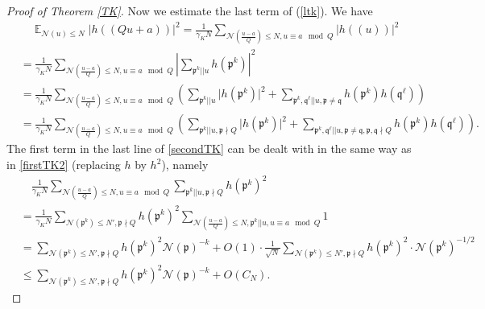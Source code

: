 \documentclass[11pt]{amsart}
\theoremstyle{definition}
\DeclareMathOperator*{\E}{\mathbb{E}}
\newcommand{\NN}{{\mathcal N}}
\newcommand{\mf}{\mathfrak}
\begin{document}
\begin{proof}[Proof of Theorem \ref{TK}]
Now we estimate the last term of (\ref{ltk}). We have
\begin{equation}\label{secondTK}
    \begin{split}
        &\quad \E_{\NN(u) \leq N}\vert h((Qu+a))\vert^{2}
        =\frac{1}{\gamma_{K} N}\sum_{\NN(\frac{u-a}{Q})\leq N, u\equiv a \mod Q}\vert h((u))\vert^{2}
        \\&=\frac{1}{\gamma_{K} N}\sum_{\NN(\frac{u-a}{Q})\leq N, u\equiv a \mod Q}\left| \sum_{\mf p^{k}|| u} h(\mf p^{k})\right|^{2}
        \\&=\frac{1}{\gamma_{K} N}\sum_{\NN(\frac{u-a}{Q})\leq N, u\equiv a \mod Q}\left(\sum_{\mf p^{k}|| u} \vert h(\mf p^{k})\vert^{2}+\sum_{\mf p^{k},\mf q^{\ell}|| u, \mf p\neq \mf q} h(\mf p^{k})h(\mf q^{\ell})\right)
          \\&=\frac{1}{\gamma_{K} N}\sum_{\NN(\frac{u-a}{Q})\leq N, u\equiv a \mod Q}\left(\sum_{\mf p^{k}|| u, \mf p\nmid Q} \vert h(\mf p^{k})\vert^{2}+\sum_{\mf p^{k},\mf q^{\ell}|| u, \mf p\neq \mf q, \mf p,\mf q\nmid Q} h(\mf p^{k})h(\mf q^{\ell})\right).
    \end{split}
\end{equation}
The first term in the last line of \eqref{secondTK} can be dealt with in the same way as in  \eqref{firstTK2} %
(replacing $h$ by $h^{2}$), namely 
\begin{equation}\label{secondTK2}
    \begin{split}
        &\quad 
        \frac{1}{\gamma_{K} N}\sum_{\NN(\frac{u-a}{Q})\leq N, u\equiv a \mod Q}\sum_{\mf p^{k}|| u, \mf p\nmid Q} h(\mf p^{k})^{2}
     \\&=\frac{1}{\gamma_{K} N}\sum_{\NN(\mf p^{k})\leq N', \mf p\nmid Q}h(\mf p^{k})^{2}\sum_{\NN(\frac{u-a}{Q})\leq N, \mf p^{k}||u, u\equiv a \mod Q} 1
     \\&=\sum_{\NN(\mf p^{k})\leq N', \mf p\nmid Q}h(\mf p^{k})^{2}\NN(\mf p)^{-k}+O(1)\cdot\frac{1}{\sqrt{N}}\sum_{\NN(\mf p^{k})\leq N', \mf p\nmid Q}h(\mf p^{k})^{2}\cdot \NN(\mf p^{k})^{-1/2}
      \\&\leq\sum_{\NN(\mf p^{k})\leq N', \mf p\nmid Q}h(\mf p^{k})^{2}\NN(\mf p)^{-k}+O(C_{N}).%

\end{split}
\end{equation}
\end{proof}
\end{document}
